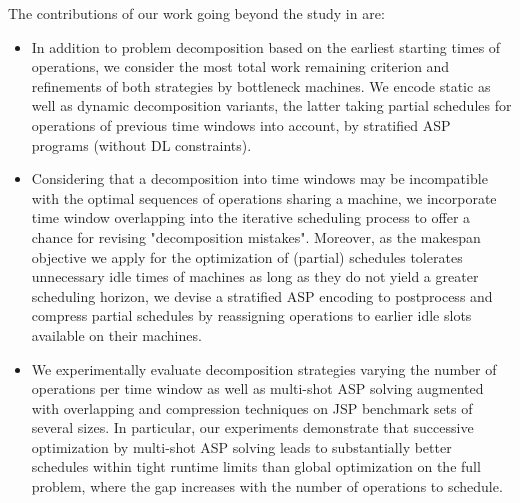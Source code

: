 \documentclass{tlp} %
\begin{document}
The contributions of our work going beyond the study in \citep{elkgeb20a} are:
\begin{itemize}
\item In addition to problem decomposition based on the earliest starting times
      of operations, we consider the most total work remaining criterion and
      refinements of both strategies by bottleneck machines.
      We encode static as well as dynamic decomposition variants, the latter taking
      partial schedules for operations of previous time windows into account, by stratified
      ASP programs (without DL constraints).
\item Considering that a decomposition into time windows may be incompatible with
      the optimal sequences of operations sharing a machine, we incorporate
      time window overlapping into the iterative scheduling process to
      offer a chance for revising "decomposition mistakes".
      Moreover, as the makespan objective we apply for the optimization of
      (partial) schedules tolerates unnecessary idle times of machines as long as
      they do not yield a greater scheduling horizon,
      we devise a stratified ASP encoding to postprocess and compress partial
      schedules by reassigning operations to earlier idle slots available on their machines.
\item We experimentally evaluate decomposition strategies varying the number of
      operations per time window as well as multi-shot ASP solving
      augmented with overlapping and compression techniques
      on JSP benchmark sets of several sizes.
      In particular, our experiments demonstrate that successive optimization
      by multi-shot ASP solving leads to substantially better schedules within
      tight runtime limits than global optimization on the full problem,
      where the gap increases with the number of operations to schedule.
\end{itemize}

\end{document}
